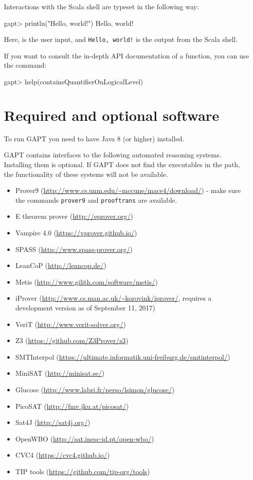 \documentclass[a4paper,11pt]{book}
\newcommand{\cli}[1]{{\ttfamily {#1}}}
\begin{document}
Interactions with the Scala shell are typeset in the following way:
\begin{clilisting}
  gapt> println("Hello, world!")
  Hello, world!

\end{clilisting}
Here, {\bfseries \cli{println("Hello, world!")}} is the user input, and \texttt{Hello,
  world!} is the output from the Scala shell.

If you want to consult the in-depth API documentation of a function, you can
use the \cli{help} command:
\begin{clilisting}
  gapt> help(containsQuantifierOnLogicalLevel)

\end{clilisting}

\section{Required and optional software}
\label{sec:sysreq}

To run GAPT you need to have Java 8 (or higher) installed.

GAPT contains interfaces to the following automated reasoning systems. Installing
them is optional. If GAPT does not find the executables in the path, the
functionality of these systems will not be available.

\begin{itemize}
  \item Prover9 (\url{http://www.cs.unm.edu/~mccune/mace4/download/}) - make sure
        the commands \texttt{prover9} and \texttt{prooftrans} are available.
  \item E theorem prover (\url{http://eprover.org/})
  \item Vampire 4.0 (\url{https://vprover.github.io/})
  \item SPASS (\url{http://www.spass-prover.org/})
  \item LeanCoP (\url{http://leancop.de/})
  \item Metis (\url{http://www.gilith.com/software/metis/})
  \item iProver (\url{http://www.cs.man.ac.uk/~korovink/iprover/}, requires
        a development version as of September 11, 2017)
  \item VeriT (\url{http://www.verit-solver.org/})
  \item Z3 (\url{https://github.com/Z3Prover/z3})
  \item SMTInterpol (\url{https://ultimate.informatik.uni-freiburg.de/smtinterpol/})
  \item MiniSAT (\url{http://minisat.se/})
  \item Glucose (\url{http://www.labri.fr/perso/lsimon/glucose/})
  \item PicoSAT (\url{http://fmv.jku.at/picosat/})
  \item Sat4J (\url{http://sat4j.org/})
  \item OpenWBO (\url{http://sat.inesc-id.pt/open-wbo/})
  \item CVC4 (\url{https://cvc4.github.io/})
  \item TIP tools (\url{https://github.com/tip-org/tools})
\end{itemize}
\end{document}
